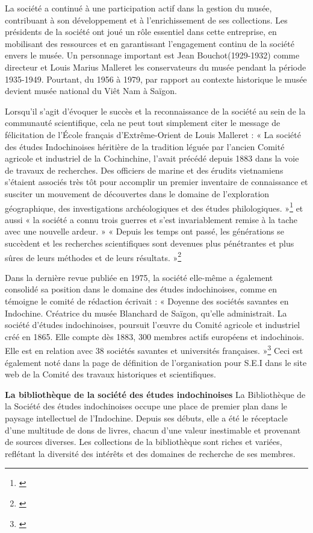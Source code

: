 La société a continué à une participation actif dans la gestion du musée, contribuant à son développement et à l'enrichissement de ses collections. Les présidents de la société ont joué un rôle essentiel dans cette entreprise, en mobilisant des ressources et en garantissant l'engagement continu de la société envers le musée. Un personnage important est Jean Bouchot(1929-1932) comme directeur et Louis Marius Malleret les conservateurs du musée pendant la période 1935-1949. Pourtant, du 1956 à 1979, par rapport au contexte historique le musée devient musée national du Viêt Nam à Saïgon.

Lorsqu'il s'agit d'évoquer le succès et la reconnaissance de la société au sein de la communauté scientifique, cela ne peut tout simplement citer le message de félicitation de l’École français d’Extrême-Orient de Louis Malleret : 
« La société des études Indochinoises héritière de la tradition léguée par l’ancien Comité agricole et industriel de la Cochinchine, l’avait précédé depuis 1883 dans la voie de travaux de recherches. Des officiers de marine et des érudits vietnamiens s’étaient associés très tôt pour accomplir un premier inventaire de connaissance et susciter un mouvement de découvertes dans le domaine de l’exploration géographique, des investigations archéologiques et des études philologiques. »\footnote{\cite{feli}}
et aussi
 « la société a connu trois guerres et s’est invariablement remise à la tache avec une nouvelle ardeur. »
« Depuis les temps ont passé, les générations se succèdent et les recherches scientifiques sont devenues plus pénétrantes et plus sûres de leurs méthodes et de leurs résultats. »\footnote{\cite{feli}}

Dans la dernière revue publiée en 1975, la société elle-même a également consolidé sa position dans le domaine des études indochinoises, comme en témoigne le comité de rédaction écrivait :
« Doyenne des sociétés savantes en Indochine. Créatrice du musée Blanchard de Saïgon, qu'elle administrait. La société d'études indochinoises, poursuit l'œuvre du Comité agricole et industriel créé en 1865. Elle compte dès 1883, 300 membres actifs européens et indochinois. Elle est en relation avec 38 sociétés savantes et universités françaises. »\footnote{\cite{fin}}
Ceci est également noté dans la page de définition de l'organisation pour S.E.I dans le site web de la Comité des travaux historiques et scientifiques.

\textbf{La bibliothèque de la société des études indochinoises
}
La Bibliothèque de la Société des études indochinoises occupe une place de premier plan dans le paysage intellectuel de l'Indochine. Depuis ses débuts, elle a été le réceptacle d'une multitude de dons de livres, chacun d'une valeur inestimable et provenant de sources diverses. Les collections de la bibliothèque sont riches et variées, reflétant la diversité des intérêts et des domaines de recherche de ses membres.

